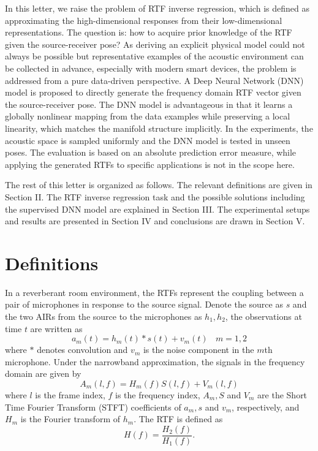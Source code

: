 \documentclass[journal]{IEEEtran}
\begin{document}
In this letter, we raise the problem of RTF inverse regression, which is defined as approximating the high-dimensional responses from their low-dimensional representations. The question is: how to acquire prior knowledge of the RTF given the source-receiver pose? As deriving an explicit physical model could not always be possible but representative examples of the acoustic environment can be collected in advance, especially with modern smart devices, the problem is addressed from a pure data-driven perspective. A Deep Neural Network (DNN) model is proposed to directly generate the frequency domain RTF vector given the source-receiver pose. The DNN model is advantageous in that it learns a globally nonlinear mapping from the data examples while preserving a local linearity, which matches the manifold structure implicitly. In the experiments, the acoustic space is sampled uniformly and the DNN model is tested in unseen poses. The evaluation is based on an absolute prediction error measure, while applying the generated RTFs to specific applications is not in the scope here.

The rest of this letter is organized as follows. The relevant definitions are given in Section II. The RTF inverse regression task and the possible solutions including the supervised DNN model are explained in Section III. The experimental setups and results are presented in Section IV and conclusions are drawn in Section V.


\section{Definitions}

In a reverberant room environment, the RTFs represent the coupling between a pair of microphones in response to the source signal. Denote the source as $s$ and the two AIRs from the source to the microphones as $h_1,h_2$, the observations at time $t$ are written as
\begin{equation}\label{eq1:sig}
  a_m(t) = h_m(t)*s(t) + v_m(t) ~~~~m=1,2
\end{equation}
where $*$ denotes convolution and $v_m$ is the noise component in the $m$th microphone. Under the narrowband approximation, the signals in the frequency domain are given by
\begin{equation}\label{eq1:sigfreq}
  A_m(l,f) = H_m(f)S(l,f) + V_m(l,f)
\end{equation}
where $l$ is the frame index, $f$ is the frequency index, $A_m,S$ and $V_m$ are the Short Time Fourier Transform (STFT) coefficients of $a_m, s$ and $v_m$, respectively, and $H_m$ is the Fourier transform of $h_m$. The RTF is defined as
\begin{equation}\label{eq:rtf}
  H(f)=\frac{H_2(f)}{H_1(f)}.
\end{equation}
\end{document}
